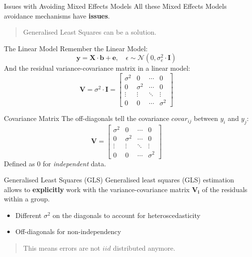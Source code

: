 \documentclass{beamer}
\begin{document}
\begin{frame}{Issues with Avoiding Mixed Effects Models}
  \small{All these Mixed Effects Models avoidance mechanisms have \textbf{issues}.}
  \begin{quote}
    Generalised Least Squares can be a solution.
  \end{quote}
\end{frame}

\begin{frame}{The Linear Model}
  Remember the Linear Model:
  \[
  \mathbf{y} = \mathbf{X} \cdot \mathbf{b} + \mathbf{e}, \quad \epsilon \sim \mathcal{N}(0, \sigma^2_{e} \cdot \mathbf{I})
  \]
  And the residual variance-covariance matrix in a linear model:
  \[
  \mathbf{V} = \sigma^2 \cdot \mathbf{I} = 
  \begin{bmatrix}
  \sigma^2 & 0 & \cdots & 0 \\
  0 & \sigma^2 & \cdots & 0 \\
  \vdots & \vdots & \ddots & \vdots \\
  0 & 0 & \cdots & \sigma^2
  \end{bmatrix}
  \]
\end{frame}

\begin{frame}{Covariance Matrix}
  The off-diagonals tell the covariance $covar_{ij}$ between $y_i$ and $y_j$:
  \[
  \mathbf{V} = 
  \begin{bmatrix}
  \sigma^2 & 0 & \cdots & 0 \\
  0 & \sigma^2 & \cdots & 0 \\
  \vdots & \vdots & \ddots & \vdots \\
  0 & 0 & \cdots & \sigma^2
  \end{bmatrix}
  \]
  Defined as $0$ for \textit{independent} data.
\end{frame}

\begin{frame}{Generalised Least Squares (GLS)}
  Generalised least squares (GLS) estimation allows to \textbf{explicitly} work with the variance-covariance matrix $\mathbf{V_i}$ of the residuals within a group.
  \begin{itemize}
    \item Different $\sigma^2$ on the diagonals to account for heteroscedasticity
    \item Off-diagonals for non-independency
  \end{itemize}
  \begin{quote}
    This means errors are not $iid$ distributed anymore.
  \end{quote}
\end{frame}
\end{document}
